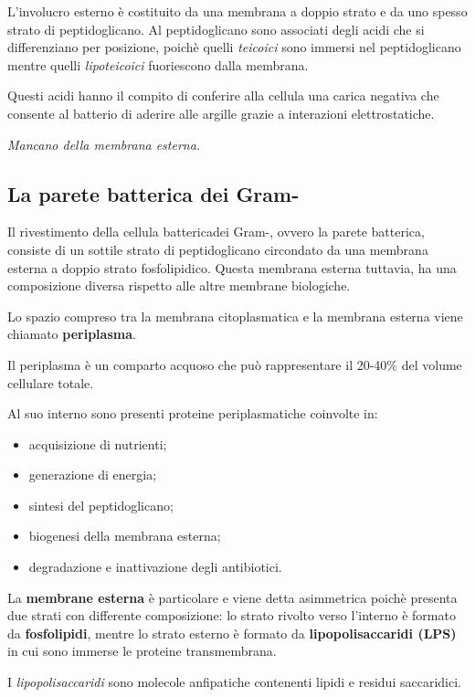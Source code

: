 \documentclass[11pt]{book}
\begin{document}
\vspace{1em}
L'involucro esterno è costituito da una membrana a doppio strato e da uno spesso strato di peptidoglicano. Al peptidoglicano sono associati degli acidi che si differenziano per posizione, poichè quelli \emph{teicoici} sono immersi nel peptidoglicano mentre quelli \emph{lipoteicoici} fuoriescono dalla membrana.

Questi acidi hanno il compito di conferire alla cellula una carica negativa che consente al batterio di aderire alle argille grazie a interazioni elettrostatiche.

\emph{Mancano della membrana esterna.}


\subsection{La parete batterica dei Gram-}
Il rivestimento della cellula battericadei Gram-, ovvero la parete batterica, consiste di un sottile strato di peptidoglicano circondato da una membrana esterna a doppio strato fosfolipidico. Questa membrana esterna tuttavia, ha una composizione diversa rispetto alle altre membrane biologiche.

Lo spazio compreso tra la membrana citoplasmatica e la membrana esterna viene chiamato \textbf{periplasma}.

\vspace{1em}
Il periplasma è un comparto acquoso che può rappresentare il 20-40$\%$ del volume cellulare totale.

Al suo interno sono presenti proteine periplasmatiche coinvolte in: 
\begin{itemize}
\item acquisizione di nutrienti;
\item generazione di energia;
\item sintesi del peptidoglicano;
\item biogenesi della membrana esterna;
\item degradazione e inattivazione degli antibiotici.
\end{itemize}

La \textbf{membrane esterna} è particolare e viene detta asimmetrica poichè presenta due strati con differente composizione: lo strato rivolto verso l'interno è formato da \textbf{fosfolipidi}, mentre lo strato esterno è formato da \textbf{lipopolisaccaridi (LPS) }in cui sono immerse le proteine transmembrana.

I \emph{lipopolisaccaridi} sono molecole anfipatiche contenenti lipidi e residui saccaridici.
\end{document}
